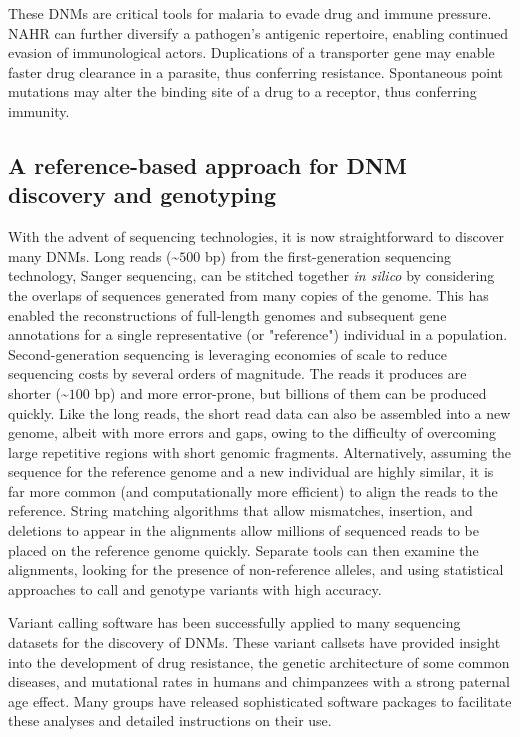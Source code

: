 These DNMs are critical tools for malaria to evade drug and immune pressure.  NAHR can further diversify a pathogen's antigenic repertoire, enabling continued evasion of immunological actors.  Duplications of a transporter gene may enable faster drug clearance in a parasite, thus conferring resistance.  Spontaneous point mutations may alter the binding site of a drug to a receptor, thus conferring immunity. 

\subsection{A reference-based approach for DNM discovery and genotyping}

With the advent of sequencing technologies, it is now straightforward to discover many DNMs.  Long reads (\textasciitilde $500$ bp) from the first-generation sequencing technology, Sanger sequencing, can be stitched together \textit{in silico} by considering the overlaps of sequences generated from many copies of the genome\cite{Myers:1995vma}.  This has enabled the reconstructions of full-length genomes and subsequent gene annotations for a single representative (or "reference") individual in a population.  Second-generation sequencing is leveraging economies of scale to reduce sequencing costs by several orders of magnitude\cite{Mardis:2011cr}.  The reads it produces are shorter (\textasciitilde $100$ bp) and more error-prone, but billions of them can be produced quickly.  Like the long reads, the short read data can also be assembled into a new genome, albeit with more errors and gaps, owing to the difficulty of overcoming large repetitive regions with short genomic fragments\cite{Schatz:2010if}.  Alternatively, assuming the sequence for the reference genome and a new individual are highly similar, it is far more common (and computationally more efficient) to align the reads to the reference\cite{Flicek:2009dl}.  String matching algorithms that allow mismatches, insertion, and deletions to appear in the alignments allow millions of sequenced reads to be placed on the reference genome quickly.  Separate tools can then examine the alignments, looking for the presence of non-reference alleles, and using statistical approaches to call and genotype variants with high accuracy\cite{Nielsen:2011kz}.

Variant calling software has been successfully applied to many sequencing datasets for the discovery of DNMs.  These variant callsets have provided insight into the development of drug resistance\cite{Woodford:2007it}, the genetic architecture of some common diseases\cite{Neale:2012ki}, and mutational rates in humans and chimpanzees with a strong paternal age effect\cite{Conrad:2011eh,Venn:2014ep,Kloosterman:2015cn,Francioli:2015kj}.  Many groups have released sophisticated software packages to facilitate these analyses and detailed instructions on their use\cite{DePristo:2011fo,Rimmer:2014ho}.

